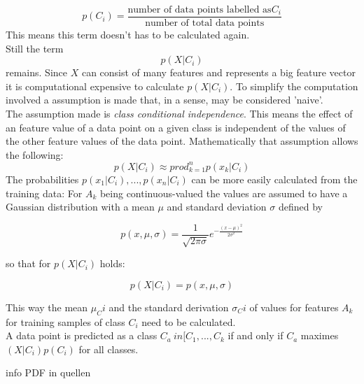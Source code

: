 \begin{equation} \label{eq:nb4}
p(C_i)=\frac{\text{number of data points labelled as}C_i}{\text{number of total data points}}
\end{equation}
This means this term doesn't has to be calculated again.
\\
Still the term
\begin{equation} \label{eq:nb5}
p(X|C_i)
\end{equation}
remains. Since $X$ can consist of many features and represents a big feature vector it is computational expensive to calculate $p(X|C_i)$. To simplify the computation involved a assumption is made that, in a sense, may be considered 'naive'.
\\
The assumption made is \emph{class conditional independence}. This means the effect of an feature value of a data point on a given class is independent of the values of the other feature values of the data point. Mathematically that assumption allows the following:
\begin{equation} \label{eq:nb6}
p(X|C_i) \approx prod_{k=1}^{n} p(x_k|C_i)
\end{equation}
The probabilities $p(x_1|C_i), ... ,p(x_n|C_i)$ can be more easily calculated from the training data:
For $A_k$ being continuous-valued the values are assumed to have a Gaussian distribution with a mean $\mu$ and standard deviation $\sigma$ defined by

\begin{equation} \label{eq:nb7}
p(x,\mu ,\sigma) = \frac{1}{\sqrt{2\pi \sigma}}e^{-\frac{(x-\mu )^2}{2\sigma ^2}}
\end{equation}

so that for $p(X|C_i)$ holds:

\begin{equation} \label{eq:nb8}
p(X|C_i) = p(x,\mu ,\sigma)
\end{equation}

This way the mean $\mu_Ci$ and the standard derivation $\sigma_Ci$ of values for features $A_k$ for training samples of class $C_i$ need to be calculated.
\\

A data point is predicted as a class $C_a \ in [C_1,...,C_k$ if and only if $C_a$ maximes $(X|C_i) p(C_i)$  for all classes.  

info PDF in quellen